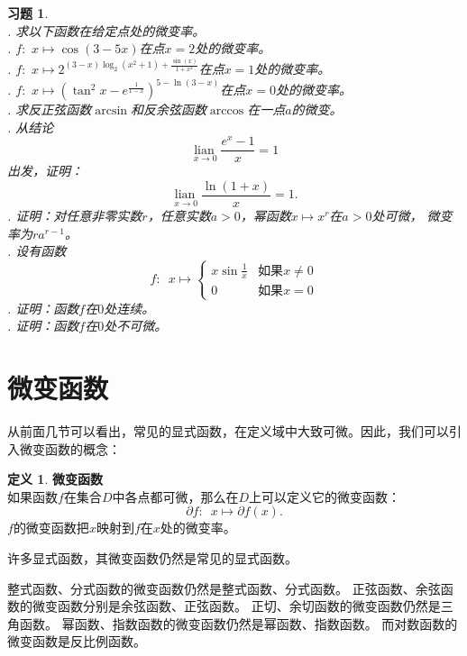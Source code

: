 \documentclass[12pt,UTF8]{ctexbook}
\newcommand{\lian}[1]{
    \underset{#1}{\operatorname{lian}\,}
}
\theoremstyle{definition}
\newtheorem{df}{定义}[section]
\theoremstyle{plain}
\newtheorem{xt}{习题}[section]
\begin{document}
\begin{xt}
    \mbox{} \\
    . 求以下函数在给定点处的微变率。\\
    . $f: \,\, x \mapsto \cos{(3 - 5x)}$在点$x = 2$处的微变率。\\
    . $f: \,\, x \mapsto 2^{(3 - x)\log_2\left(x^2 + 1\right) + \frac{\sin(x)}{1 + x^2}}$在点$x = 1$处的微变率。\\
    . $f: \,\, x \mapsto (\tan^2{x} - e^{\frac{1}{1-x}})^{5 - \ln(3 - x)}$在点$x = 0$处的微变率。\\
    . 求反正弦函数$\arcsin$和反余弦函数$\arccos$在一点$a$的微变。\\
    . 从结论
    $$ \lian{x\to 0} \frac{e^x - 1}{x} = 1$$
    \indent 出发，证明：
    $$ \lian{x\to 0} \frac{\ln{(1 + x)}}{x} = 1.$$
    . 证明：对任意非零实数$r$，任意实数$a>0$，幂函数$x \mapsto x^r$在$a>0$处可微，
    微变率为$ra^{r-1}$。\\
    . 设有函数
    $$f: \,\,\, x \mapsto \left\{
        \begin{array}{cl}
            x\sin{\frac{1}{x}}  & \mbox{如果}x \neq 0 \\
            0 & \mbox{如果}x = 0
        \end{array}\right.
    $$
    . 证明：函数$f$在$0$处连续。\\
    . 证明：函数$f$在$0$处不可微。
\end{xt}

\section{微变函数}
从前面几节可以看出，常见的显式函数，在定义域中大致可微。因此，我们可以引入微变函数的概念：
\begin{df}{\textbf{微变函数}}\label{df:2-4-0}
    \mbox{} \\
    如果函数$f$在集合$D$中各点都可微，那么在$D$上可以定义它的微变函数：
    $$ \partial f : \,\,\, x \mapsto \partial f(x). $$
    $f$的微变函数把$x$映射到$f$在$x$处的微变率。
\end{df}

许多显式函数，其微变函数仍然是常见的显式函数。

整式函数、分式函数的微变函数仍然是整式函数、分式函数。
正弦函数、余弦函数的微变函数分别是余弦函数、正弦函数。
正切、余切函数的微变函数仍然是三角函数。
幂函数、指数函数的微变函数仍然是幂函数、指数函数。
而对数函数的微变函数是反比例函数。
\end{document}
